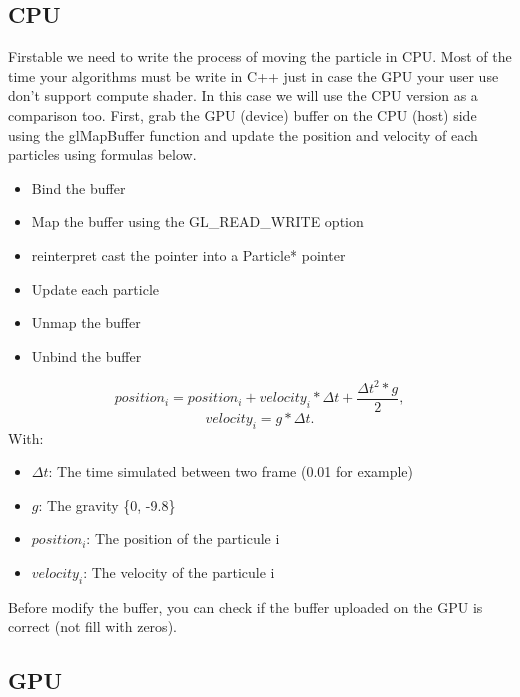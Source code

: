 \documentclass{article}
\begin{document}
\subsection{CPU}
Firstable we need to write the process of moving the particle in CPU. Most of the time your algorithms must be write in C++ just in case the GPU your user use don't support compute shader. In this case we will use the CPU version as a comparison too. First, grab the GPU (device) buffer on the CPU (host) side using the glMapBuffer function and update the position and velocity of each particles using formulas below.
\begin{itemize}
	\item Bind the buffer
	\item Map the buffer using the GL\_READ\_WRITE option
	\item reinterpret cast the pointer into a Particle* pointer
	\item Update each particle
	\item Unmap the buffer
	\item Unbind the buffer
\end{itemize}

\begin{equation}
position_i = position_i + velocity_i * \Delta t + \frac{\Delta t^2*g}{2},
\end{equation}
\begin{equation}
velocity_i = g*\Delta t.
\end{equation}
With:
\begin{itemize}
	\item $\Delta t$: The time simulated between two frame (0.01 for example)
	\item $g$: The gravity \{0, -9.8\}
	\item $position_i$: The position of the particule i
	\item $velocity_i$: The velocity of the particule i
\end{itemize}
Before modify the buffer, you can check if the buffer uploaded on the GPU is correct (not fill with zeros).
\subsection{GPU}
\end{document}
